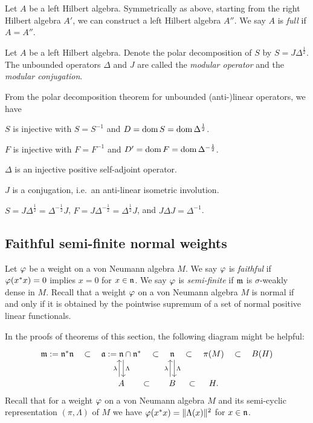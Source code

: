 \documentclass{../../small}
\begin{document}
\begin{defn}
Let $A$ be a left Hilbert algebra.
Symmetrically as above, starting from the right Hilbert algebra $A'$, we can construct a left Hilbert algebra $A''$.
We say $A$ is \emph{full} if $A=A''$.
\end{defn}


\begin{defn}
Let $A$ be a left Hilbert algebra.
Denote the polar decomposition of $S$ by $S=J\Delta^{\frac12}$.
The unbounded operators $\Delta$ and $J$ are called the \emph{modular operator} and the \emph{modular conjugation}.
\end{defn}

\begin{cor}
From the polar decomposition theorem for unbounded (anti-)linear operators, we have
\begin{parts}
\item $S$ is injective with $S=S^{-1}$ and $D=\operatorname{dom} S=\operatorname{dom}\Delta^{\frac12}$.
\item $F$ is injective with $F=F^{-1}$ and $D'=\operatorname{dom} F=\operatorname{dom}\Delta^{-\frac12}$.
\item $\Delta$ is an injective positive self-adjoint operator.
\item $J$ is a conjugation, i.e.~an anti-linear isometric involution.
\item $S=J\Delta^{\frac12}=\Delta^{-\frac12}J$, $F=J\Delta^{-\frac12}=\Delta^{\frac12}J$, and $J\Delta J=\Delta^{-1}$.
\end{parts}
\end{cor}





\subsection{Faithful semi-finite normal weights}

\begin{defn}
Let $\varphi$ be a weight on a von Neumann algebra $M$.
We say $\varphi$ is \emph{faithful} if $\varphi(x^*x)=0$ implies $x=0$ for $x\in\mathfrak{n}$.
We say $\varphi$ is \emph{semi-finite} if $\mathfrak{m}$ is $\sigma$-weakly dense in $M$.
Recall that a weight $\varphi$ on a von Neumann algebra $M$ is normal if and only if it is obtained by the pointwise supremum of a set of normal positive linear functionals.
\end{defn}

In the proofs of theorems of this section, the following diagram might be helpful: 
\[\begin{tikzcd}
\fm:=\fn^*\fn \rar[phantom,"\subset"] & \fa:=\fn\cap\fn^* \rar[phantom,"\subset"]\dar[shift left]{\Lambda} & \fn \rar[phantom,"\subset"]\dar[shift left]{\Lambda} & \pi(M) \rar[phantom,"\subset"] & B(H)\\
& A \rar[phantom,"\subset"]\uar[shift left]{\lambda} & B \rar[phantom,"\subset"]\uar[shift left]{\lambda} & H.
\end{tikzcd}\]
Recall that for a weight $\varphi$ on a von Neumann algebra $M$ and its semi-cyclic representation $(\pi,\Lambda)$ of $M$ we have $\varphi(x^*x)=\|\Lambda(x)\|^2$ for $x\in\mathfrak{n}$.
\end{document}
